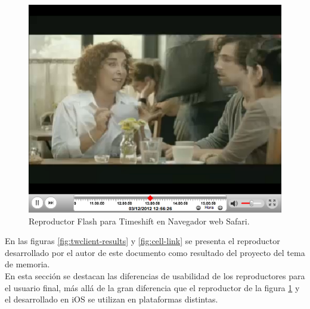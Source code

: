 \begin{figure}[H]
	\centering
	\includegraphics[scale=0.6]{imgs/eag-player.png} 
	\caption{Reproductor Flash para Timeshift en Navegador web Safari.}
	\label{fig:eag-player}
\end{figure}  

En las figuras \ref{fig:twclient-results} y \ref{fig:cell-link} se presenta el reproductor desarrollado por el autor de este documento como resultado del proyecto del tema de memoria.\\

En esta sección se destacan las diferencias de usabilidad de los reproductores para el usuario final, más allá de la gran diferencia que el reproductor de la figura \ref{fig:eag-player} y el desarrollado en iOS se utilizan en plataformas distintas. 

